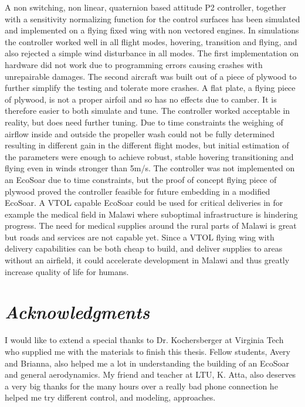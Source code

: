 \documentclass{article}
\begin{document}
\abstract
A non switching, non linear, quaternion based attitude P2 controller, together with a sensitivity normalizing function for the control surfaces has been simulated and implemented on a flying fixed wing with non vectored engines.
In simulations the controller worked well in all flight modes, hovering, transition and flying, and also rejected a simple wind disturbance in all modes.
The first implementation on hardware did not work due to programming errors causing crashes with unrepairable damages.
The second aircraft was built out of a piece of plywood to further simplify the testing and tolerate more crashes.
A flat plate, a flying piece of plywood, is not a proper airfoil and so has no effects due to camber.
It is therefore easier to both simulate and tune.
The controller worked acceptable in reality, but does need further tuning.
Due to time constraints the weighing of airflow inside and outside the propeller wash could not be fully determined resulting in different gain in the different flight modes, but initial estimation of the parameters were enough to achieve robust, stable hovering transitioning and flying even in winds stronger than 5m/s.%
The controller was not implemented on an EcoSoar due to time constraints, but the proof of concept flying piece of plywood proved the controller feasible for future embedding in a modified EcoSoar. 
A VTOL capable EcoSoar could be used for critical deliveries in for example the medical field in Malawi where suboptimal infrastructure is hindering progress.
The need for medical supplies around the rural parts of Malawi is great but roads and services are not capable yet.
Since a VTOL flying wing with delivery capabilities can be both cheap to build, and deliver supplies to areas without an airfield, it could accelerate development in Malawi and thus greatly increase quality of life for humans.


\newpage
\section*{\textit{Acknowledgments}}

I would like to extend a special thanks to Dr. Kochersberger at Virginia Tech who supplied me with the materials to finish this thesis.
Fellow students, Avery and Brianna, also helped me a lot in understanding the building of an EcoSoar and general aerodynamics.
My friend and teacher at LTU, K. Atta, also deserves a very big thanks for the many hours over a really bad phone connection he helped me try different control, and modeling, approaches.
\end{document}
